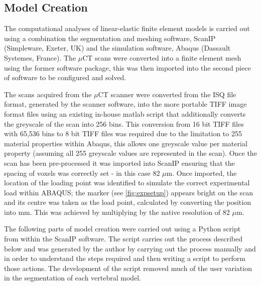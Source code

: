 
\subsection{Model Creation}\label{model-creation}

The computational analyses of linear-elastic finite element models is
carried out using a combination the segmentation and meshing software, ScanIP (Simpleware, Exeter, UK) and the simulation software, Abaqus (Dassault Systemes, France). The $\mu$CT scans were converted into a
finite element mesh using the former software package, this was then
imported into the second piece of software to be configured and solved.

The scans acquired from the \(\mu\)CT scanner were converted from the ISQ
file format, generated by the scanner software, into the more portable TIFF image format files using an existing in-house  matlab script that
additionally converts the greyscale of the scan into 256 bins. This conversion from 16 bit TIFF files with 65,536 bins to 8 bit TIFF files was required due to the limitation to 255 material properties within Abaqus, this allows one greyscale value per material property (assuming all 255 greyscale values are represented in the scan). Once the
scan has been pre-processed it was imported into ScanIP ensuring
that the spacing of voxels was correctly set - in this case 82 \(\mu\)m.
Once imported, the location of the loading point was identified to
simulate the correct experimental load within ABAQUS; the marker (see \cref{fig:expsetup})
appears bright on the scan and its centre was taken as the load point,
calculated by converting the position into mm. This was achieved by
multiplying by the native resolution of 82 \(\mu\)m.

The following parts of model creation were carried out using a Python script from within the ScanIP software. The script carries out the process described below and was generated by the author by carrying out the process manually and in order to understand the steps required and then writing a script to perform those actions. The development of the script removed much of the user variation in the segmentation of each vertebral model.


